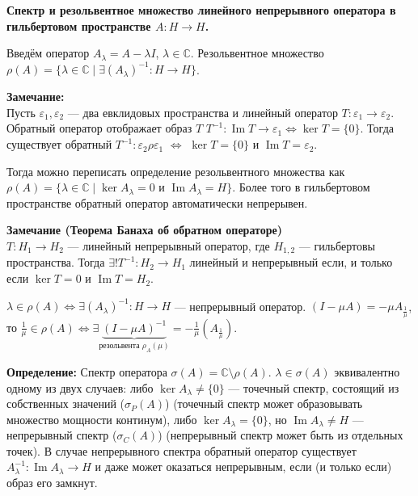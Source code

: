 \documentclass[12pt]{article}
\DeclareMathOperator{\Imm}{Im}
\begin{document}
\begin{center}
    \textbf{Спектр и резольвентное множество линейного непрерывного оператора в гильбертовом пространстве $A : H \to H$.}
\end{center}

Введём оператор $A_\lambda = A - \lambda I$, $\lambda \in \mathbb C$.
Резольвентное множество $\rho(A) = \{\lambda \in \mathbb C \mid \exists (A_\lambda)^{-1} : H \to H\}$.

\textbf{Замечание:}\\
Пусть $\varepsilon_1, \varepsilon_2$ --- два евклидовых пространства и линейный оператор $T : \varepsilon_1 \to \varepsilon_2$.
Обратный оператор отображает образ $T$ $T^{-1} : \Imm T \to \varepsilon_1 \Leftrightarrow \ker T = \{0\}$.
Тогда существует обратный $T^{-1}:\varepsilon_2 \rho \varepsilon_1$ $\Leftrightarrow$ $\ker T = \{0\}$ и $\Imm T = \varepsilon_2$.

Тогда можно переписать определение резольвентного множества как $\rho(A) = \{\lambda \in \mathbb C \mid \ker A_\lambda = 0\text{ и }\Imm A_\lambda = H \}$.
Более того в гильбертовом пространстве обратный оператор автоматически непрерывен.

\textbf{Замечание (Теорема Банаха об обратном операторе)}\\
$T:H_1 \to H_2$ --- линейный непрерывный оператор, где $H_{1,2}$ --- гильбертовы пространства.
Тогда $\exists! T^{-1} : H_2 \to H_1$ линейный и непрерывный если, и только если $\ker T = 0$ и $\Imm T = H_2$.

$\lambda \in \rho(A) \Leftrightarrow \exists(A_\lambda)^{-1} : H \to H$ --- непрерывный оператор.
$(I - \mu A) = -\mu A_{\frac{1}{\mu}}$, то $\frac{1}{\mu} \in \rho(A) \Leftrightarrow \exists \underbrace{(I - \mu A)^{-1}}_{\text{резольвента }\rho_A(\mu)}
= -\frac{1}{\mu}(A_{\frac{1}{\mu}})$.

\textbf{Определение:} Спектр оператора $\sigma(A) = \mathbb C \setminus \rho(A)$. $\lambda \in \sigma(A)$ эквивалентно одному из двух случаев:
либо $\ker A_\lambda \ne \{0\}$ --- точечный спектр, состоящий из собственных значений ($\sigma_P(A)$) (точечный спектр может образовывать множество мощности континум),
либо $\ker A_\lambda = \{0\}$, но $\Imm A_\lambda \ne H$ --- непрерывный спектр ($\sigma_C(A)$) (непрерывный спектр может быть из отдельных точек).
В случае непрерывного спектра обратный оператор существует $A_\lambda^{-1} : \Imm A_\lambda \to H$ и даже может оказаться непрерывным, если (и только если) образ его
замкнут.
\end{document}
